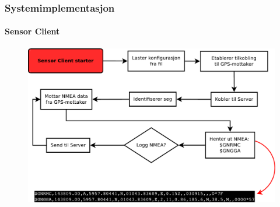 \documentclass[xcolor=table]{beamer}
\begin{document}
\begin{frame}
\frametitle{Systemimplementasjon}
  \framesubtitle{Sensor Client}
    \begin{figure}
      \includegraphics[scale=0.25]{thesis/graphics/client_simplified.pdf}
    \end{figure}
\end{frame}
\end{document}
